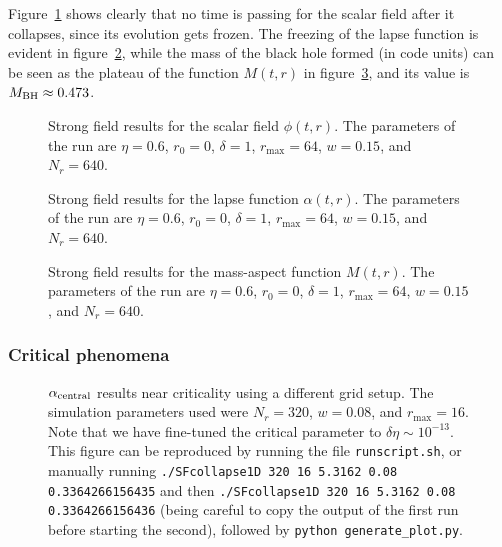 \documentclass[a4paper,11pt]{article}
\renewcommand{\a}{\alpha}
\renewcommand{\d}{\delta}
\begin{document}
Figure~\ref{fig:phi_strong} shows clearly that no time is passing for the scalar field after it collapses, since its evolution gets frozen. The freezing of the lapse function is evident in figure~\ref{fig:alpha_strong}, while the mass of the black hole formed (in code units) can be seen as the plateau of the function $M(t,r)$ in figure~\ref{fig:mass_strong}, and its value is $M_{\rm BH}\approx0.473$.

\begin{figure}[H]
  \centering
  
  \caption[Strong field results for the scalar field $\phi(t,r)$.]{Strong field results for the scalar field $\phi(t,r)$. The parameters of the run are $\eta=0.6$, $r_{0}=0$, $\delta=1$, $r_{\max}=64$, $w=0.15$, and $N_{r}=640$.}
  \label{fig:phi_strong}
\end{figure}

\begin{figure}[H]
  \centering
  
  \caption[Strong field results for the lapse function $\a(t,r)$.]{Strong field results for the lapse function $\a(t,r)$. The parameters of the run are $\eta=0.6$, $r_{0}=0$, $\delta=1$, $r_{\max}=64$, $w=0.15$, and $N_{r}=640$.}
  \label{fig:alpha_strong}
\end{figure}

\begin{figure}[H]
  \centering
  
  \caption[Strong field results for the mass-aspect function $M(t,r)$.]{Strong field results for the mass-aspect function $M(t,r)$. The parameters of the run are $\eta=0.6$, $r_{0}=0$, $\delta=1$, $r_{\max}=64$, $w=0.15$, and $N_{r}=640$.}
  \label{fig:mass_strong}
\end{figure}

\subsubsection{Critical phenomena}

\begin{figure}[H]
  \centering
  
  \caption[$\alpha_{\rm central}$ results near criticality using a
    different grid setup.]{$\alpha_{\rm central}$ results near
    criticality using a different grid setup. The simulation parameters
    used were $N_{r}=320$, $w=0.08$, and $r_{\max}=16$. Note that we
    have fine-tuned the critical parameter to $\d\eta\sim10^{-13}$. This
    figure can be reproduced by running the file \texttt{runscript.sh},
    or manually running \texttt{./SFcollapse1D 320 16 5.3162 0.08
      0.3364266156435} and then \texttt{./SFcollapse1D 320 16 5.3162
      0.08 0.3364266156436} (being careful to copy the output of the
    first run before starting the second), followed by \texttt{python generate\_plot.py}. }
  \label{fig:critical_alpha}
\end{figure}
\end{document}
